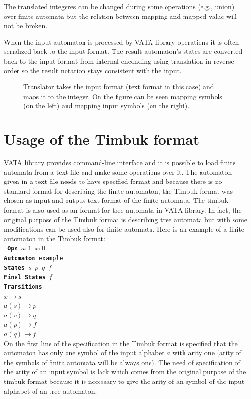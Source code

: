 The translated integeres can be changed during some operations (e.g., union) over finite automata but the relation between mapping and mapped value will
not be broken.

When the input automaton is processed by VATA library operations it is often serialized back to the input format. The result 
automaton's states are converted back to the input format from internal enconding using translation in reverse order
so the result notation stays consistent with the input.

\begin{figure}
\begin{center}

		\label{figExplicitFADataStr}
    \caption{Translator takes the input format (text format in this case) and maps it to the integer. On the figure can
    be seen mapping symbols (on the left) and mapping input symbols (on the right).}
\end{center}
\end{figure}

\section{Usage of the Timbuk format}
\label{usageTimub}
VATA library provides command-line interface and it is possible to load finite automata from a text file and make some operations over it. 
The automaton given in a text file needs to have specified format and because 
there is no standard format for describing the finite automaton, the Timbuk format \cite{timbuk} was chosen as input and output text format
of the finite automata. The timbuk format is also used as an format for tree automata in VATA library. 
In fact, the original purpose of the Timbuk format is describing tree automata but with some modifications can be used also for finite automata. 
Here is an example of a finite automaton in the Timbuk format:\\
\texttt {
  \textbf{Ops} $a:1$ $x:0$\\
  \textbf{Automaton} example\\
  \textbf{States} $s$ $p$ $q$ $f$\\
  \textbf{Final States} $f$\\
  \textbf{Transitions}\\
  \indent $x \rightarrow s$\\
  \indent $a(s) \rightarrow p$\\
  \indent $a(s) \rightarrow q$\\
  \indent $a(p) \rightarrow f$\\
  \indent $a(q) \rightarrow f$\\
}
On the first line of the specification in the Timbuk format
is specified that the automaton has only one symbol of the input alphabet $a$ with arity one (arity of the symbols of finita automata will
be always one). 
The need of specification of the arity of an input symbol is
lack which comes from the original purpose of the timbuk format because it is necessary to give the arity of an symbol of the input alphabet of an tree automaton.

